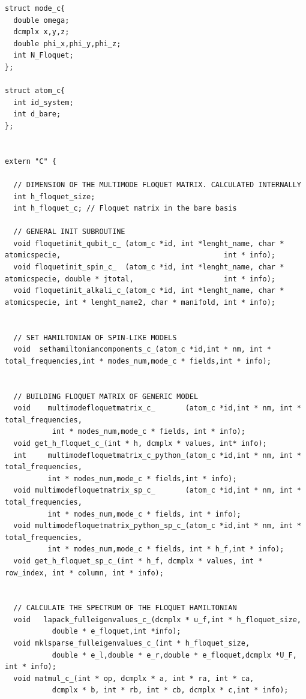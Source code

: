 \documentclass[10pt,a4paper]{article}
\begin{document}
\begin{verbatim}
struct mode_c{
  double omega;
  dcmplx x,y,z;
  double phi_x,phi_y,phi_z;
  int N_Floquet;
};

struct atom_c{
  int id_system;
  int d_bare;
};


extern "C" {

  // DIMENSION OF THE MULTIMODE FLOQUET MATRIX. CALCULATED INTERNALLY
  int h_floquet_size;
  int h_floquet_c; // Floquet matrix in the bare basis

  // GENERAL INIT SUBROUTINE
  void floquetinit_qubit_c_ (atom_c *id, int *lenght_name, char * atomicspecie,                                      int * info);
  void floquetinit_spin_c_  (atom_c *id, int *lenght_name, char * atomicspecie, double * jtotal,                     int * info);
  void floquetinit_alkali_c_(atom_c *id, int *lenght_name, char * atomicspecie, int * lenght_name2, char * manifold, int * info);
  
       
  // SET HAMILTONIAN OF SPIN-LIKE MODELS
  void  sethamiltoniancomponents_c_(atom_c *id,int * nm, int * total_frequencies,int * modes_num,mode_c * fields,int * info);
  
  
  // BUILDING FLOQUET MATRIX OF GENERIC MODEL
  void    multimodefloquetmatrix_c_       (atom_c *id,int * nm, int * total_frequencies,
           int * modes_num,mode_c * fields, int * info);
  void get_h_floquet_c_(int * h, dcmplx * values, int* info);
  int     multimodefloquetmatrix_c_python_(atom_c *id,int * nm, int * total_frequencies,
          int * modes_num,mode_c * fields,int * info);
  void multimodefloquetmatrix_sp_c_       (atom_c *id,int * nm, int * total_frequencies,
          int * modes_num,mode_c * fields, int * info);
  void multimodefloquetmatrix_python_sp_c_(atom_c *id,int * nm, int * total_frequencies,
          int * modes_num,mode_c * fields, int * h_f,int * info);
  void get_h_floquet_sp_c_(int * h_f, dcmplx * values, int * row_index, int * column, int * info);

  
  // CALCULATE THE SPECTRUM OF THE FLOQUET HAMILTONIAN
  void   lapack_fulleigenvalues_c_(dcmplx * u_f,int * h_floquet_size,
           double * e_floquet,int *info);
  void mklsparse_fulleigenvalues_c_(int * h_floquet_size,
           double * e_l,double * e_r,double * e_floquet,dcmplx *U_F, int * info);
  void matmul_c_(int * op, dcmplx * a, int * ra, int * ca, 
           dcmplx * b, int * rb, int * cb, dcmplx * c,int * info);
  

\end{verbatim}
\end{document}
